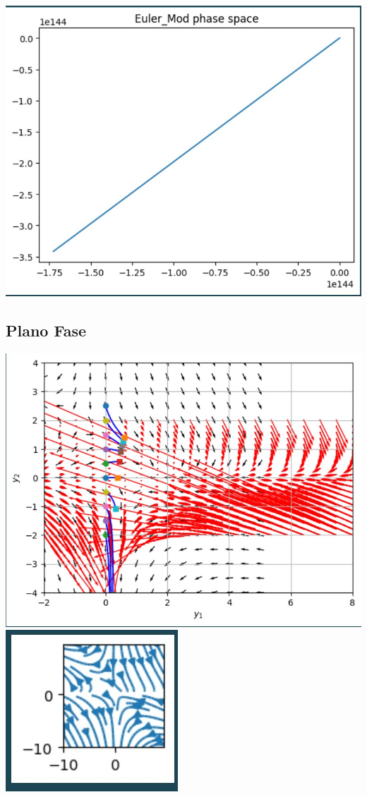 \documentclass{article}
\begin{document}
               \includegraphics{eulermodx,y.jpg}
          \subsection*{Plano Fase}
            \includegraphics{planofasenumericccc.jpg}
             \includegraphics{isoclinas numerico.jpg}
\end{document}
